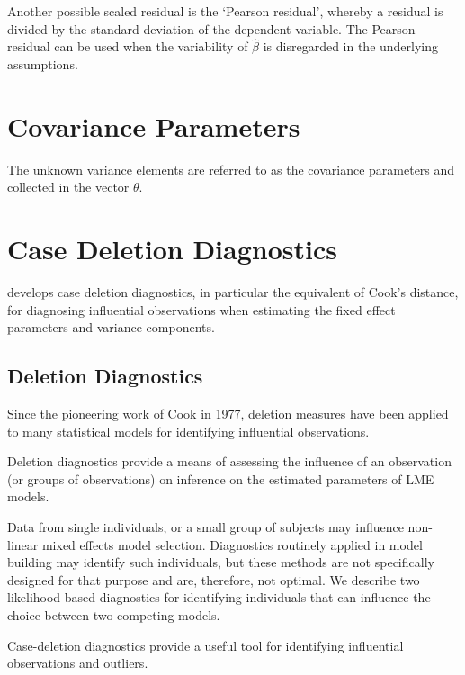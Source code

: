 \documentclass[12pt, a4paper]{report}
\theoremstyle{plain}
\theoremstyle{definition}
\theoremstyle{remark}
\begin{document}
Another possible scaled residual is the  `Pearson residual', whereby a residual is divided by the standard deviation of the dependent variable. The Pearson residual can be used when the variability of $\hat{\beta}$ is disregarded in the underlying assumptions.

\newpage
\section{Covariance Parameters} %
The unknown variance elements are referred to as the covariance parameters and collected in the vector $\theta$.
\newpage
\section{Case Deletion Diagnostics} %

\citet{CPJ} develops  case deletion diagnostics, in particular the equivalent of  Cook's distance, for diagnosing influential observations when estimating the fixed effect parameters and variance components.

\subsection{Deletion Diagnostics}

Since the pioneering work of Cook in 1977, deletion measures have been applied to many statistical models for identifying influential observations.

Deletion diagnostics provide a means of assessing the influence of an observation (or groups of observations) on inference on the estimated parameters of LME models.

Data from single individuals, or a small group of subjects may influence non-linear mixed effects model selection. Diagnostics routinely applied in model building may identify such individuals, but these methods are not specifically designed for that purpose and are, therefore, not optimal. We describe two likelihood-based diagnostics for identifying individuals that can influence the choice between two competing models.

Case-deletion diagnostics provide a useful tool for identifying influential observations and outliers.
\end{document}
